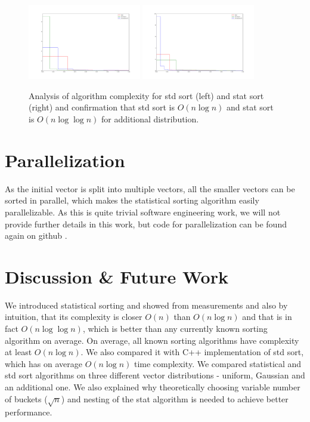 \documentclass[12pt]{article}
\begin{document}
                \begin{figure}
		\begin{center}
			\includegraphics[width=0.44\textwidth]{fig_dist_anal_weird_stdsort.png}
			\includegraphics[width=0.44\textwidth]{fig_dist_anal_weird_statsort.png}
		\end{center}
		\caption{Analysis of algorithm complexity for std sort (left) and stat sort (right) and confirmation that std sort is $O(n \log n)$ and stat sort is $O(n \log \log n)$ for additional distribution.}
		\label{fig7}
		\end{figure}	
	\section{Parallelization}
	
	As the initial vector is split into multiple vectors, all the smaller vectors can be sorted in parallel, which makes the statistical sorting algorithm easily parallelizable. As this is quite trivial software engineering work, we will not provide further details in this work, but code for parallelization can be found again on github \cite{peta78b}.

	\section{Discussion \& Future Work}
	
	We introduced statistical sorting and showed from measurements and also by intuition, that its complexity is closer $O(n)$ than $O(n \log n)$ and that is in fact $O(n \log \log n)$, which is better than any currently known sorting algorithm on average. On average, all known sorting algorithms have complexity at least $O(n \log n)$. We also compared it with C++ implementation of std sort, which has on average $O(n \log n)$ time complexity. We compared statistical and std sort algorithms on three different vector distributions - uniform, Gaussian and an additional one. We also explained why theoretically choosing variable number of buckets ($\sqrt{n}$) and nesting of the stat algorithm is needed to achieve better performance.
	
\end{document}
